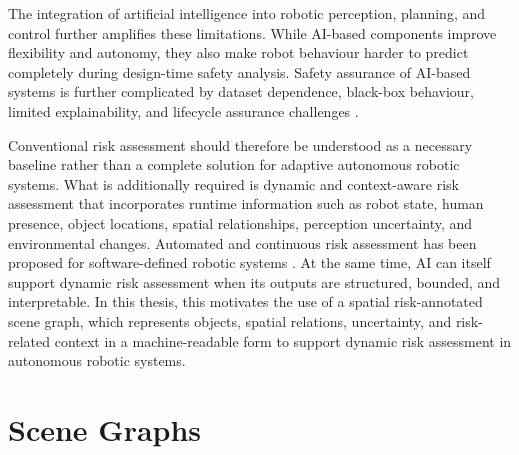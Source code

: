 {\small

The integration of artificial intelligence into robotic perception, planning, and control further amplifies these limitations. While AI-based components improve flexibility and autonomy, they also make robot behaviour harder to predict completely during design-time safety analysis. Safety assurance of AI-based systems is further complicated by dataset dependence, black-box behaviour, limited explainability, and lifecycle assurance challenges \cite{silvaneto2022aisafetyassurance}.

Conventional risk assessment should therefore be understood as a necessary baseline rather than a complete solution for adaptive autonomous robotic systems. What is additionally required is dynamic and context-aware risk assessment that incorporates runtime information such as robot state, human presence, object locations, spatial relationships, perception uncertainty, and environmental changes. Automated and continuous risk assessment has been proposed for software-defined robotic systems \cite{grimmeisen2023continuousrisk}. At the same time, AI can itself support dynamic risk assessment when its outputs are structured, bounded, and interpretable. In this thesis, this motivates the use of a spatial risk-annotated scene graph, which represents objects, spatial relations, uncertainty, and risk-related context in a machine-readable form to support dynamic risk assessment in autonomous robotic systems.

}













\section{Scene Graphs}

